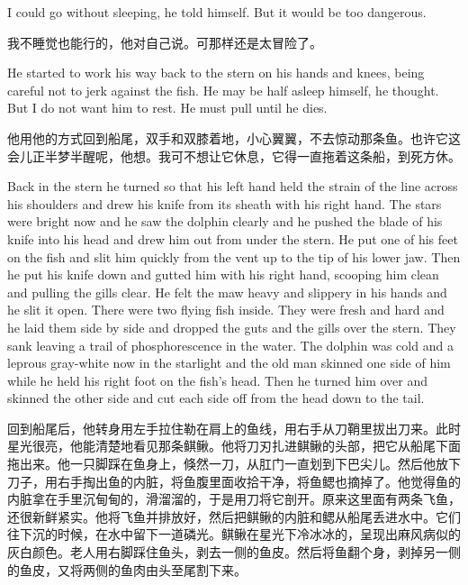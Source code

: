 \begin{paracol}{2}
\switchcolumn*

I could go without sleeping, he told himself. But it would be too dangerous.

\switchcolumn

我不睡觉也能行的，他对自己说。可那样还是太冒险了。

\switchcolumn*

He started to work his way back to the stern on his hands and knees, being
careful not to jerk against the fish. He may be half asleep himself, he
thought. But I do not want him to rest. He must pull until he dies.

\switchcolumn

他用他的方式回到船尾，双手和双膝着地，小心翼翼，不去惊动那条鱼。也许它这会儿正半梦半醒呢，他想。我可不想让它休息，它得一直拖着这条船，到死方休。

\switchcolumn*

Back in the stern he turned so that his left hand held the strain of the
line across his shoulders and drew his knife from its sheath with his right
hand. The stars were bright now and he saw the dolphin clearly and he pushed
the blade of his knife into his head and drew him out from under the stern.
He put one of his feet on the fish and \gls{slit} him quickly from the
\gls{vent} up to the \gls{tip} of his lower jaw. Then he put his knife down
and \gls{gutted} him with his right hand, scooping him clean and pulling the
\glspl{gill} clear. He felt the \gls{maw} heavy and \gls{slippery} in his
hands and he slit it open. There were two flying fish inside. They were
fresh and hard and he laid them side by side and dropped the guts and the
gills over the stern. They \gls{sank} leaving a trail of phosphorescence in
the water. The dolphin was cold and a \gls{leprous} gray-white now in the
starlight and the old man skinned one side of him while he held his right
foot on the fish's head. Then he turned him over and skinned the other side
and cut each side off from the head down to the tail.

\switchcolumn

回到船尾后，他转身用左手拉住勒在肩上的鱼线，用右手从刀鞘里拔出刀来。此时星光很亮，他能清楚地看见那条鲯鳅。他将刀刃扎进鲯鳅的头部，把它从船尾下面拖出来。他一只脚踩在鱼身上，倏然一刀，从肛门一直划到下巴尖儿。然后他放下刀子，用右手掏出鱼的内脏，将鱼腹里面收拾干净，将鱼鳃也摘掉了。他觉得鱼的内脏拿在手里沉甸甸的，滑溜溜的，于是用刀将它剖开。原来这里面有两条飞鱼，还很新鲜紧实。他将飞鱼并排放好，然后把鲯鳅的内脏和鳃从船尾丢进水中。它们往下沉的时候，在水中留下一道磷光。鲯鳅在星光下冷冰冰的，呈现出麻风病似的灰白颜色。老人用右脚踩住鱼头，剥去一侧的鱼皮。然后将鱼翻个身，剥掉另一侧的鱼皮，又将两侧的鱼肉由头至尾割下来。


\end{paracol}
